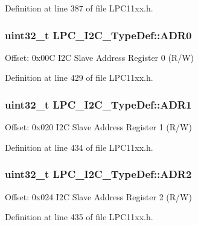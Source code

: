 Definition at line 387 of file L\+P\+C11xx.\+h.

\subsubsection[{\texorpdfstring{A\+D\+R0}{ADR0}}]{ uint32\+\_\+t L\+P\+C\+\_\+\+I2\+C\+\_\+\+Type\+Def\+::\+A\+D\+R0}\hypertarget{group___l_p_c11xx___definitions_gac8ed8ecb80a084f3f10a82d7e29dc069}{}\label{group___l_p_c11xx___definitions_gac8ed8ecb80a084f3f10a82d7e29dc069}
Offset\+: 0x00C I2C Slave Address Register 0 (R/W) 

Definition at line 429 of file L\+P\+C11xx.\+h.

\subsubsection[{\texorpdfstring{A\+D\+R1}{ADR1}}]{ uint32\+\_\+t L\+P\+C\+\_\+\+I2\+C\+\_\+\+Type\+Def\+::\+A\+D\+R1}\hypertarget{group___l_p_c11xx___definitions_gab280cbe7965f098dd17a41ee2641710a}{}\label{group___l_p_c11xx___definitions_gab280cbe7965f098dd17a41ee2641710a}
Offset\+: 0x020 I2C Slave Address Register 1 (R/W) 

Definition at line 434 of file L\+P\+C11xx.\+h.

\subsubsection[{\texorpdfstring{A\+D\+R2}{ADR2}}]{ uint32\+\_\+t L\+P\+C\+\_\+\+I2\+C\+\_\+\+Type\+Def\+::\+A\+D\+R2}\hypertarget{group___l_p_c11xx___definitions_ga45e6b501bf1fdfb6787f6d15d52e2f6c}{}\label{group___l_p_c11xx___definitions_ga45e6b501bf1fdfb6787f6d15d52e2f6c}
Offset\+: 0x024 I2C Slave Address Register 2 (R/W) 

Definition at line 435 of file L\+P\+C11xx.\+h.

